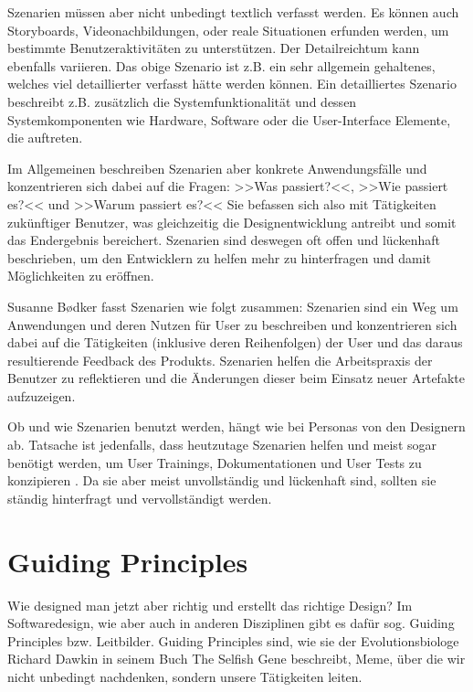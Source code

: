 \medskip Szenarien müssen aber nicht unbedingt textlich verfasst werden. Es können auch Storyboards, Videonachbildungen, oder reale Situationen erfunden werden, um bestimmte Benutzeraktivitäten zu unterstützen. Der Detailreichtum kann ebenfalls variieren. Das obige Szenario ist z.B. ein sehr allgemein gehaltenes, welches viel detaillierter verfasst hätte werden können. Ein detailliertes Szenario beschreibt z.B. zusätzlich die Systemfunktionalität und dessen Systemkomponenten wie Hardware, Software oder die User-Interface Elemente, die auftreten.

\medskip Im Allgemeinen beschreiben Szenarien aber konkrete Anwendungsfälle und konzentrieren sich dabei auf die Fragen: >>Was passiert?<<, >>Wie passiert es?<< und >>Warum passiert es?<< 
Sie befassen sich also mit Tätigkeiten zukünftiger Benutzer, was gleichzeitig die Designentwicklung antreibt und somit das Endergebnis bereichert. Szenarien sind deswegen oft offen und lückenhaft beschrieben, um den Entwicklern zu helfen mehr zu hinterfragen und damit Möglichkeiten zu eröffnen. \citep{Carroll:1995}

\medskip Susanne B{\o}dker fasst Szenarien wie folgt zusammen:
Szenarien sind ein Weg um Anwendungen und deren Nutzen für User zu beschreiben und konzentrieren sich dabei auf die Tätigkeiten (inklusive deren Reihenfolgen) der User und das daraus resultierende Feedback des Produkts. Szenarien helfen die Arbeitspraxis der Benutzer zu reflektieren und die Änderungen dieser beim Einsatz neuer Artefakte aufzuzeigen. \citep{Bodker:1991}

\medskip Ob und wie Szenarien benutzt werden, hängt wie bei Personas von den Designern ab. Tatsache ist jedenfalls, dass heutzutage Szenarien helfen und meist sogar benötigt werden, um User Trainings, Dokumentationen und User Tests zu konzipieren \citep{Carroll:1995}. Da sie aber meist unvollständig und lückenhaft sind, sollten sie ständig hinterfragt und vervollständigt werden.

\section{Guiding Principles} \label{ssec:GuidingPrinciples}
Wie designed man jetzt aber richtig und erstellt das richtige Design? Im Softwaredesign, wie aber auch in anderen Disziplinen gibt es dafür sog. Guiding Principles bzw. Leitbilder. Guiding Principles sind, wie sie der Evolutionsbiologe Richard Dawkin in seinem Buch The Selfish Gene beschreibt, Meme, über die wir nicht unbedingt nachdenken, sondern unsere Tätigkeiten leiten.

